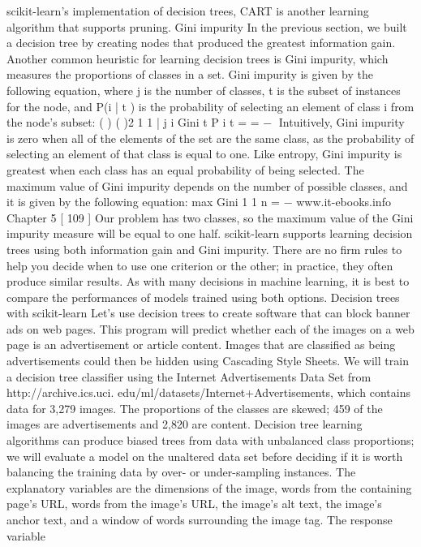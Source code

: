 scikit-learn's implementation of decision trees, CART is another learning algorithm
that supports pruning.
Gini impurity
In the previous section, we built a decision tree by creating nodes that produced
the greatest information gain. Another common heuristic for learning decision trees
is Gini impurity, which measures the proportions of classes in a set. Gini impurity
is given by the following equation, where j is the number of classes, t is the subset
of instances for the node, and P(i | t ) is the probability of selecting an element of
class i from the node's subset:
( ) ( )2
1
1 |
j
i
Gini t P i t
=
= −
Intuitively, Gini impurity is zero when all of the elements of the set are the same
class, as the probability of selecting an element of that class is equal to one. Like
entropy, Gini impurity is greatest when each class has an equal probability of being
selected. The maximum value of Gini impurity depends on the number of possible
classes, and it is given by the following equation:
max
Gini 1 1
n
= −
www.it-ebooks.info
Chapter 5
[ 109 ]
Our problem has two classes, so the maximum value of the Gini impurity measure
will be equal to one half. scikit-learn supports learning decision trees using both
information gain and Gini impurity. There are no firm rules to help you decide when
to use one criterion or the other; in practice, they often produce similar results. As
with many decisions in machine learning, it is best to compare the performances of
models trained using both options.
Decision trees with scikit-learn
Let's use decision trees to create software that can block banner ads on web pages.
This program will predict whether each of the images on a web page is an
advertisement or article content. Images that are classified as being advertisements
could then be hidden using Cascading Style Sheets. We will train a decision tree
classifier using the Internet Advertisements Data Set from http://archive.ics.uci.
edu/ml/datasets/Internet+Advertisements, which contains data for 3,279 images.
The proportions of the classes are skewed; 459 of the images are advertisements and
2,820 are content. Decision tree learning algorithms can produce biased trees from data
with unbalanced class proportions; we will evaluate a model on the unaltered data set
before deciding if it is worth balancing the training data by over- or under-sampling
instances. The explanatory variables are the dimensions of the image, words from the
containing page's URL, words from the image's URL, the image's alt text, the image's
anchor text, and a window of words surrounding the image tag. The response variable

